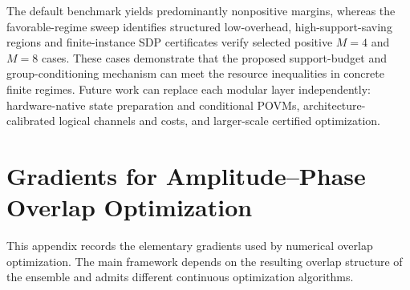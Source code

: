 \documentclass[
 reprint,
 amsmath,amssymb,
 aps,
 pra,
 floatfix,
]{revtex4-2}
\begin{document}
The default benchmark yields predominantly nonpositive margins, whereas the favorable-regime sweep identifies structured low-overhead, high-support-saving regions and finite-instance SDP certificates verify selected positive \(M=4\) and \(M=8\) cases. These cases demonstrate that the proposed support-budget and group-conditioning mechanism can meet the resource inequalities in concrete finite regimes. Future work can replace each modular layer independently: hardware-native state preparation and conditional POVMs, architecture-calibrated logical channels and costs, and larger-scale certified optimization.

\appendix
\setcounter{theorem}{0}
\setcounter{figure}{0}
\setcounter{table}{0}
\renewcommand{\thetheorem}{\Alph{section}\arabic{theorem}}
\renewcommand{\thefigure}{\Alph{section}\arabic{figure}}
\renewcommand{\thetable}{\Alph{section}\arabic{table}}
\renewcommand{\theHfigure}{\Alph{section}.\arabic{figure}}
\renewcommand{\theHtable}{\Alph{section}.\arabic{table}}

\section{Gradients for Amplitude--Phase Overlap Optimization}
\label{app:gradients}

This appendix records the elementary gradients used by numerical overlap optimization. The main framework depends on the resulting overlap structure of the ensemble and admits different continuous optimization algorithms.
\end{document}
